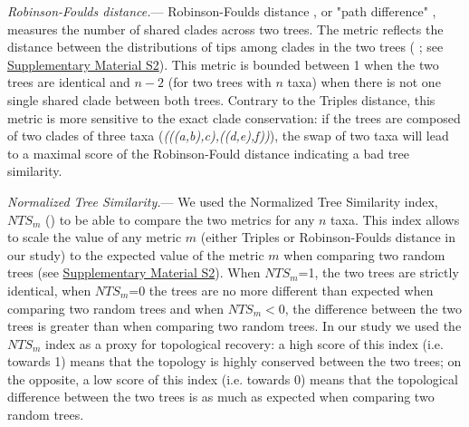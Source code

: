 \documentclass[12pt,letterpaper]{article}
\renewcommand{\subsubsection}[1]{%
\vspace{2ex}
\noindent
\textit{#1.}---}
\begin{document}
\subsubsection{Robinson-Foulds distance} %
Robinson-Foulds distance \citep{RF1981}, or "path difference"
    , measures the number of shared clades across two trees.
The metric reflects the distance between the distributions of tips among clades in the two trees (\citealt{RF1981} ; see \hyperref[SupplementaryMaterial]{Supplementary Material S2}).
This metric is bounded between 1 when the two trees are identical and $n-2$ (for two trees with $n$ taxa) when there is not one single shared clade between both trees.
Contrary to the Triples distance, this metric is more sensitive to the exact clade conservation: if the trees are composed of two clades of three taxa (\textit{(((a,b),c),((d,e),f))}), the swap of two taxa will lead to a maximal score of the Robinson-Fould distance indicating a bad tree similarity.


\subsubsection{Normalized Tree Similarity}
We used the Normalized Tree Similarity index, $NTS_m$ (\citealp{Bogdanowicz2012}) to be able to compare the two metrics for any $n$ taxa.
This index allows to scale the value of any metric $m$ (either Triples or Robinson-Foulds distance in our study) to the expected value of the metric $m$ when comparing two random trees (see \hyperref[SupplementaryMaterial]{Supplementary Material S2}).
When $NTS_m$=1, the two trees are strictly identical, when $NTS_m$=0 the trees are no more different than expected when comparing two random trees and when $NTS_m$$<$0, the difference between the two trees is greater than when comparing two random trees.
In our study we used the $NTS_m$ index as a proxy for topological recovery: a high score of this index (i.e. towards 1) means that the topology is highly conserved between the two trees; on the opposite, a low score of this index (i.e. towards 0) means that the topological difference between the two trees is as much as expected when comparing two random trees.
\end{document}
